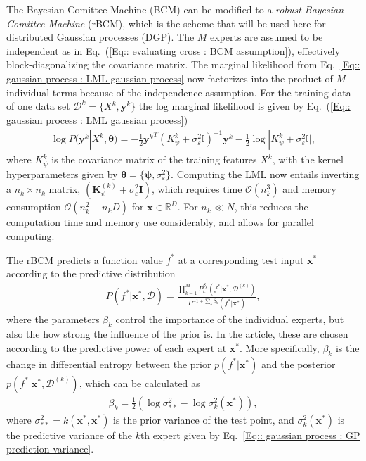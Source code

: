 \documentclass[twoside,english]{uiofysmaster}
\begin{document}
The Bayesian Comittee Machine (BCM) can be modified to a \textit{robust Bayesian Comittee Machine} (rBCM), which is the scheme that will be used here for distributed Gaussian processes (DGP). The $M$ experts are assumed to be independent \cite{deisenroth2015distributed} as in Eq.~(\ref{Eq:: evaluating cross : BCM assumption}), effectively block-diagonalizing the covariance matrix. The marginal likelihood from Eq.~\ref{Eq:: gaussian process : LML gaussian process} now factorizes into the product of $M$ individual terms because of the independence assumption. For the training data of one data set $\mathcal{D}^k = \{X^k, \textbf{y}^k \}$ the log marginal likelihood is given by Eq.~(\ref{Eq:: gaussian process : LML gaussian process})
\begin{align}
\log P(\textbf{y}^k|X^k, \boldsymbol{\theta}) = - \frac{1}{2} {\textbf{y}^k}^T (K_{\psi}^k + \sigma_{\varepsilon}^2 \mathbb{I})^{-1}\textbf{y}^k - \frac{1}{2} \log
 |K_{\psi}^k + \sigma_{\varepsilon}^2 \mathbb{I} |,
\end{align}
where $K_{\psi}^k$ is the covariance matrix of the training features $X^k$, with the kernel hyperparameters given by $\boldsymbol{\theta} = \{ \boldsymbol{\psi}, \sigma_{\varepsilon}^2 \}$. Computing the LML now entails inverting a $n_k \times n_k$ matrix, $(\textbf{K}_{\psi}^{(k)} + \sigma_{\varepsilon}^2 \textbf{I})$, which requires time $\mathcal{O}(n_k^3)$ and memory consumption $\mathcal{O}(n_k^2 + n_kD)$ for $\textbf{x} \in \mathbb{R}^D$. For $n_k \ll N$, this reduces the computation time and memory use considerably, and allows for parallel computing. 

The rBCM predicts a function value $f^*$ at a corresponding test input $\textbf{x}^*$ according to the predictive distribution
\begin{align}
P(f^* | \textbf{x}^*, \mathcal{D}) = \frac{\prod_{k=1}^M P_k^{\beta_k} (f^*| \textbf{x}^*, \mathcal{D}^{(k)})}{P^{-1 + \sum_k \beta_k} (f^* | \textbf{x}^*)},
\end{align}
where the parameters $\beta_k$ control the importance of the individual experts, but also the how strong the influence of the prior is. In the article, these are chosen according to the predictive power of each expert at $\textbf{x}^*$. More specifically, $\beta_k$ is the change in differential entropy between the prior $p(f^* | \textbf{x}^*)$ and the posterior $p(f^* | \textbf{x}^*, \mathcal{D}^{(k)})$, which can be calculated as 
\begin{align}
\beta_k = \frac{1}{2} (\log \sigma_{**}^2 - \log \sigma^2_k(\textbf{x}^*) ),
\end{align}
where $\sigma_{**}^2 = k(\textbf{x}^*, \textbf{x}^*)$ is the prior variance of the test point, and $\sigma_k^2 (\textbf{x}^*)$ is the predictive variance of the $k$th expert given by Eq.~\ref{Eq:: gaussian process : GP prediction variance}. 
\end{document}
